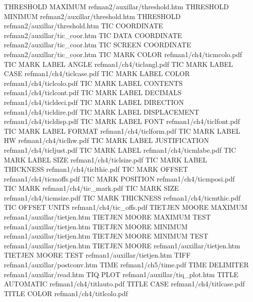 THRESHOLD MAXIMUM                       refman2/auxillar/threshold.htm
THRESHOLD MINIMUM                       refman2/auxillar/threshold.htm
THRESHOLD                               refman2/auxillar/threshold.htm
TIC COORDINATE                          refman2/auxillar/tic_coor.htm
TIC DATA COORDINATE                     refman2/auxillar/tic_coor.htm
TIC SCREEN COORDINATE                   refman2/auxillar/tic_coor.htm
TIC MARK COLOR                          refman1/ch4/ticmcolo.pdf
TIC MARK LABEL ANGLE                    refman1/ch4/ticlangl.pdf
TIC MARK LABEL CASE                     refman1/ch4/ticlcase.pdf
TIC MARK LABEL COLOR                    refman1/ch4/ticlcolo.pdf
TIC MARK LABEL CONTENTS                 refman1/ch4/ticlcont.pdf
TIC MARK LABEL DECIMALS                 refman1/ch4/ticldeci.pdf
TIC MARK LABEL DIRECTION                refman1/ch4/ticldire.pdf
TIC MARK LABEL DISPLACEMENT             refman1/ch4/ticldisp.pdf
TIC MARK LABEL FONT                     refman1/ch4/ticlfont.pdf
TIC MARK LABEL FORMAT                   refman1/ch4/ticlform.pdf
TIC MARK LABEL HW                       refman1/ch4/ticlhw.pdf
TIC MARK LABEL JUSTIFICATION            refman1/ch4/ticljust.pdf
TIC MARK LABEL                          refman1/ch4/ticmlabe.pdf
TIC MARK LABEL SIZE                     refman1/ch4/ticlsize.pdf
TIC MARK LABEL THICKNESS                refman1/ch4/ticlthic.pdf
TIC MARK OFFSET                         refman1/ch4/ticmoffs.pdf
TIC MARK POSITION                       refman1/ch4/ticmposi.pdf
TIC MARK                                refman1/ch4/tic_mark.pdf
TIC MARK SIZE                           refman1/ch4/ticmsize.pdf
TIC MARK THICKNESS                      refman1/ch4/ticmthic.pdf
TIC OFFSET UNITS                        refman1/ch4/tic_offs.pdf
TIETJEN MOORE MAXIMUM                   refman1/auxillar/tietjen.htm
TIETJEN MOORE MAXIMUM TEST              refman1/auxillar/tietjen.htm
TIETJEN MOORE MINIMUM                   refman1/auxillar/tietjen.htm
TIETJEN MOORE MINIMUM TEST              refman1/auxillar/tietjen.htm
TIETJEN MOORE                           refman1/auxillar/tietjen.htm
TIETJEN MOORE TEST                      refman1/auxillar/tietjen.htm
TIFF                                    refman1/auxillar/postconv.htm
TIME                                    refman1/ch5/time.pdf
TIME DELIMITER                          refman1/auxillar/read.htm
TIQ PLOT                                refman1/auxillar/tiq_plot.htm
TITLE AUTOMATIC                         refman1/ch4/titlauto.pdf
TITLE CASE                              refman1/ch4/titlcase.pdf
TITLE COLOR                             refman1/ch4/titlcolo.pdf
